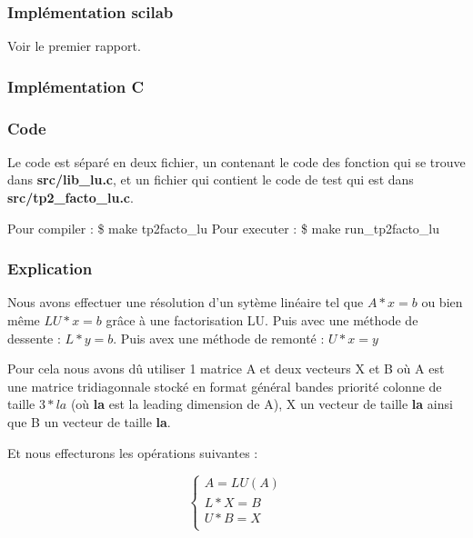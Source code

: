 \documentclass[11pt]{article}
\begin{document}
\subsubsection{Implémentation scilab}

Voir le premier rapport.

\subsubsection{Implémentation C}

\subsubsection{Code}

Le code est séparé en deux fichier, un contenant le code des fonction
qui se trouve dans \textbf{src/lib\_lu.c}, et un fichier qui contient
le code de test qui est dans \textbf{src/tp2\_facto\_lu.c}.\newline

Pour compiler : \$ make tp2facto\_lu\newline
Pour executer : \$ make run\_tp2facto\_lu\newline

\subsubsection{Explication}

Nous avons effectuer une résolution d'un sytème linéaire tel que $A *
x = b$ ou bien même $LU * x = b $ grâce à une factorisation
LU.\newline
Puis avec une méthode de dessente : $ L * y = b $.\newline
Puis avex une méthode de remonté : $ U * x = y $\newline

Pour cela nous avons dû utiliser 1 matrice A et deux vecteurs X et B
où A est une matrice tridiagonnale stocké en format général bandes 
priorité colonne de taille $3 * la$ (où \textbf{la} est la leading dimension de
A), X un vecteur de taille \textbf{la} ainsi que B un vecteur de
taille \textbf{la}.\newline

Et nous effecturons les opérations suivantes :

\begin{equation*}
  \left\{
  \begin{array}{l}
    A = LU(A) \\
    L * X = B \\
    U * B = X \\
  \end{array}
  \right.
\end{equation*}
\end{document}
